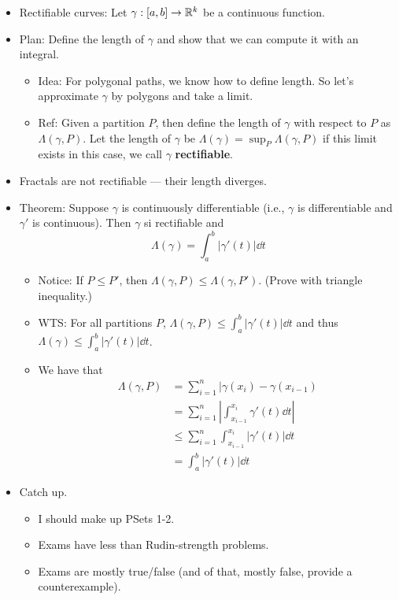\documentclass[../notes.tex]{subfiles}
\begin{document}
\begin{itemize}
    \item Rectifiable curves: Let $\gamma:[a,b]\to\mathbb{R}^k$ be a continuous function.
    \item Plan: Define the length of $\gamma$ and show that we can compute it with an integral.
    \begin{itemize}
        \item Idea: For polygonal paths, we know how to define length. So let's approximate $\gamma$ by polygons and take a limit.
        \item Ref: Given a partition $P$, then define the length of $\gamma$ with respect to $P$ as $\Lambda(\gamma,P)$. Let the length of $\gamma$ be $\Lambda(\gamma)=\sup_P\Lambda(\gamma,P)$ if this limit exists in this case, we call $\gamma$ \textbf{rectifiable}.
    \end{itemize}
    \item Fractals are not rectifiable --- their length diverges.
    \item Theorem: Suppose $\gamma$ is continuously differentiable (i.e., $\gamma$ is differentiable and $\gamma'$ is continuous). Then $\gamma$ si rectifiable and
    \begin{equation*}
        \Lambda(\gamma) = \int_a^b|\gamma'(t)|\dd{t}
    \end{equation*}
    \begin{itemize}
        \item Notice: If $P\leq P'$, then $\Lambda(\gamma,P)\leq\Lambda(\gamma,P')$. (Prove with triangle inequality.)
        \item WTS: For all partitions $P$, $\Lambda(\gamma,P)\leq\int_a^b|\gamma'(t)|\dd{t}$ and thus $\Lambda(\gamma)\leq\int_a^b|\gamma'(t)|\dd{t}$.
        \item We have that
        \begin{align*}
            \Lambda(\gamma,P) &= \sum_{i=1}^n|\gamma(x_i)-\gamma(x_{i-1})\\
            &= \sum_{i=1}^n\left| \int_{x_{i-1}}^{x_i}\gamma'(t)\dd{t} \right|\\
            &\leq \sum_{i=1}^n\int_{x_{i-1}}^{x_i}|\gamma'(t)|\dd{t}\\
            &= \int_a^b|\gamma'(t)|\dd{t}
        \end{align*}
    \end{itemize}
    \item Catch up.
    \begin{itemize}
        \item I should make up PSets 1-2.
        \item Exams have less than Rudin-strength problems.
        \item Exams are mostly true/false (and of that, mostly false, provide a counterexample).
    \end{itemize}
\end{itemize}
\end{document}
